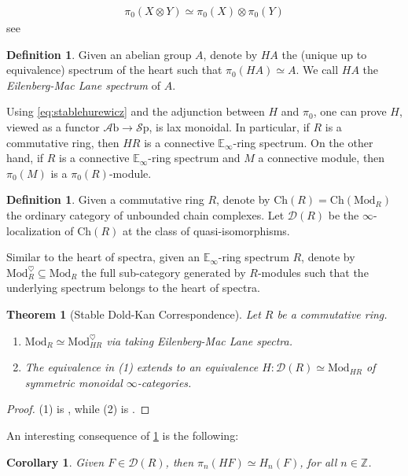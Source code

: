 \documentclass[10pt]{amsart}
\newcommand{\D}{\mathscr{D}}
\newcommand{\bE}{\mathbb{E}}
\newcommand{\bZ}{\mathbb{Z}}
\newcommand{\Sp}{\mathscr{S}\mathrm{p}}
\newcommand{\Ch}{\mathrm{Ch}}
\newcommand{\Mod}{\mathrm{Mod}}
\newcommand{\Ab}{\mathscr{A}\mathrm{b}}
\newtheorem{theorem}[equation]{Theorem}
\newtheorem{corollary}[equation]{Corollary}
\theoremstyle{definition}
\newtheorem{definition}[equation]{Definition}
\theoremstyle{remark}
\numberwithin{equation}{section}
\begin{document}
\begin{align}\label{eq:stablehurewicz}
  \pi_0(X\otimes Y)\simeq\pi_0(X)\otimes\pi_0(Y)
\end{align}
see \cite[Theorem 2.3.28]{davies2024atii}

\begin{definition}Given an abelian group $A$, denote by $HA$ the (unique up to equivalence) spectrum of the heart such that $\pi_0(HA)\simeq A$. We call $HA$ the \emph{Eilenberg-Mac Lane spectrum} of $A$.
\end{definition}
Using \cref{eq:stablehurewicz} and the adjunction between $H$ and $\pi_0$, one can prove $H$, viewed as a functor $\Ab\to\Sp$, is lax monoidal. In particular, if $R$ is a commutative ring, then $HR$ is a connective $\bE_\infty$-ring spectrum. On the other hand, if $R$ is a connective $\bE_\infty$-ring spectrum and $M$ a connective module, then $\pi_0(M)$ is a $\pi_0(R)$-module. 
\begin{definition}
  Given a commutative ring $R$, denote by $\Ch(R)=\Ch(\Mod_{R})$ the ordinary category of unbounded chain complexes. Let $\D(R)$ be the $\infty$-localization of $\Ch(R)$ at the class of quasi-isomorphisms.  
\end{definition} 
Similar to the heart of spectra, given an $\bE_\infty$-ring spectrum $R$, denote by $\Mod_{R}^\heartsuit\subseteq \Mod_{R}$ the full sub-category generated by $R$-modules such that the underlying spectrum belongs to the heart of spectra. 
\begin{theorem}[Stable Dold-Kan Correspondence]\label{thm:stabledk}
  Let $R$ be a commutative ring. 
  \begin{enumerate}
    \item $\Mod_{R}\simeq \Mod_{HR}^\heartsuit$ via taking Eilenberg-Mac Lane spectra.
    \item The equivalence in (1) extends to an equivalence $H:\D(R)\simeq \Mod_{HR}$ of symmetric monoidal $\infty$-categories.
  \end{enumerate} 
\end{theorem}
\begin{proof}
  (1) is \cite[Proposition 7.1.1.13]{lurie2017ha}, while (2) is \cite[Theorem 7.1.2.13]{lurie2017ha}.
\end{proof}
An interesting consequence of \cref{thm:stabledk} is the following:
\begin{corollary}\label{cor:homotopyvshomology}
  Given $F\in\D(R)$, then $\pi_n(HF)\simeq H_n(F)$, for all $n\in\bZ$.
\end{corollary}
\end{document}
